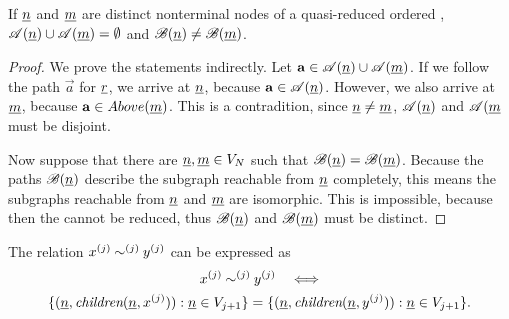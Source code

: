\begin{obs}
  If $\underline{n}$ and $\underline{m}$ are distinct nonterminal nodes of a
  quasi-reduced ordered ,
  $\mathscr{A}(\underline{n}) \cup \mathscr{A}(\underline{m}) = \emptyset$ and
  $\mathscr{B}(\underline{n}) \ne \mathscr{B}(\underline{m})$.
\end{obs}

\begin{proof}
  We prove the statements indirectly. Let
  $\bm{\mathrm{a}} \in \mathscr{A}(\underline{n}) \cup \mathscr{A}(\underline{m})$. If we
  follow the path $\vec{a}$ for $\underline{r}$, we arrive at
  $\underline{n}$, because $\bm{\mathrm{a}} \in \mathscr{A}(\underline{n})$. However, we
  also arrive at $\underline{m}$, because
  $\bm{\mathrm{a}} \in Above(\underline{m})$. This is a contradition, since
  $\underline{n} \ne \underline{m}$, $\mathscr{A}(\underline{n})$ and
  $\mathscr{A}(\underline{m}$ must be disjoint.

  Now suppose that there are $\underline{n}, \underline{m} \in V_N$ such
  that $\mathscr{B}(\underline{n}) = \mathscr{B}(\underline{m})$. Because the paths
  $\mathscr{B}(\underline{n})$ describe the subgraph reachable from
  $\underline{n}$ completely, this means the subgraphs reachable from
  $\underline{n}$ and $\underline{m}$ are isomorphic. This is impossible,
  because then the  cannot be reduced, thus
  $\mathscr{B}(\underline{n})$ and $\mathscr{B}(\underline{m})$ must be distinct.
\end{proof}

\begin{obs}
  \label{obs:genstor:symbolic:parallel-edges}
  The relation $x^{(j)} \mathbin{\sim^{(j)}} y^{(j)}$ can be
  expressed as
  \begin{multline}
    x^{(j)} \mathbin{\sim^{(j)}} y^{(j)}
    \quad\Longleftrightarrow\\
    \{ (\underline{n}, \textit{children}(\underline{n}, x^{(j)})) : \underline{n}
    \in V_{j + 1} \} = \{ (\underline{n}, \textit{children}(\underline{n},
    y^{(j)})) : \underline{n} \in V_{j + 1} \} \text.
  \end{multline}
\end{obs}

